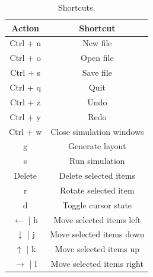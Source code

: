 \begin{table}
\begin{center}
\begin{singlespace}
\begin{tabular}{| c | c |}
\hline
Action & Shortcut \\
\hline
\hline
Ctrl + n & New file \\
Ctrl + o & Open file \\
Ctrl + s & Save file \\
Ctrl + q & Quit \\
Ctrl + z & Undo \\
Ctrl + y & Redo \\
Ctrl + w & Close simulation windows \\
g & Generate layout \\
s & Run simulation \\
Delete & Delete selected items \\
r & Rotate selected item \\
d & Toggle cursor state \\
$\leftarrow$ | h & Move selected items left \\
$\downarrow$ | j & Move selected items down \\
$\uparrow$ | k & Move selected items up \\
$\rightarrow$ | l & Move selected items right \\
\hline
\end{tabular}
\end{singlespace}
\end{center}
\label{tb:shortcuts}
\caption{Shortcuts.}
\end{table}
